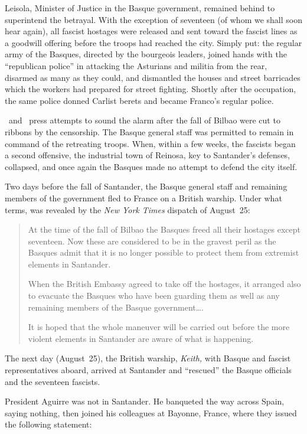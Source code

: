 Leisola, Minister of Justice in the Basque government, remained behind to superintend the betrayal. With the exception of seventeen (of whom we shall soon hear again), all fascist hostages were released and sent toward the fascist lines as a goodwill offering before the troops had reached the city. Simply put: the regular army of the Basques, directed by the bourgeois leaders, joined hands with the ``republican police'' in attacking the Asturians and militia from the rear, disarmed as many as they could, and dismantled the houses and street barricades which the workers had prepared for street fighting. Shortly after the occupation, the same police donned Carlist berets and became Franco’s regular police.

\CNT\ and \UGT\ press attempts to sound the alarm after the fall of Bilbao were cut to ribbons by the censorship. The Basque general staff was permitted to remain in command of the retreating troops. When, within a few weeks, the fascists began a second offensive, the industrial town of Reinosa, key to Santander’s defenses, collapsed, and once again the Basques made no attempt to defend the city itself.

Two days before the fall of Santander, the Basque general staff and remaining members of the government fled to France on a British warship. Under what terms, was revealed by the \emph{New York Times} dispatch of August~25:

\begin{quotation}
  At the time of the fall of Bilbao the Basques freed all their hostages except seventeen. Now these are considered to be in the gravest peril as the Basques admit that it is no longer possible to protect them from extremist elements in Santander.
  
  When the British Embassy agreed to take off the hostages, it arranged also to evacuate the Basques who have been guarding them as well as any remaining members of the Basque government\dots.
  
  It is hoped that the whole maneuver will be carried out before the more violent elements in Santander are aware of what is happening.
\end{quotation}

The next day (August~25), the British warship, \emph{Keith,} with Basque and fascist representatives aboard, arrived at Santander and ``res\-cued'' the Basque officials and the seventeen fascists.

President Aguirre was not in Santander. He banqueted the way across Spain, saying nothing, then joined his colleagues at Bayonne, France, where they issued the following statement:


